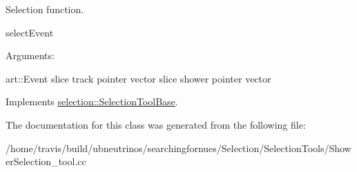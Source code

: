 Selection function. 

select\+Event

Arguments\+:

art\+::\+Event slice track pointer vector slice shower pointer vector 

Implements \hyperlink{classselection_1_1SelectionToolBase_ab63818dac49b43418fe9eb3b8cd98c9c}{selection\+::\+Selection\+Tool\+Base}.



The documentation for this class was generated from the following file\+:\begin{DoxyCompactItemize}
\item 
/home/travis/build/ubneutrinos/searchingfornues/\+Selection/\+Selection\+Tools/Shower\+Selection\+\_\+tool.\+cc\end{DoxyCompactItemize}
